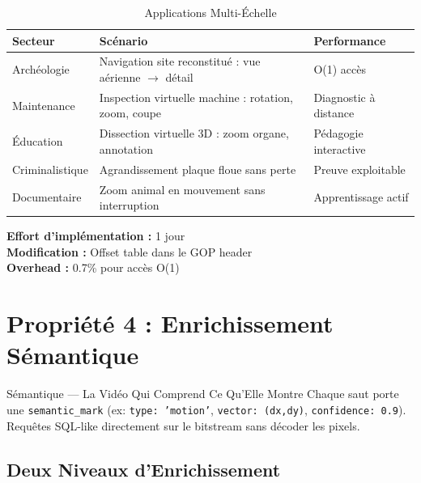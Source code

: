 \documentclass[12pt,a4paper]{article}
\begin{document}
	\begin{table}[h]
		\centering
		\caption{Applications Multi-Échelle}
		\label{tab:multi_echelle}
		\begin{tabular}{@{}lll@{}}
			\toprule
			\textbf{Secteur} & \textbf{Scénario} & \textbf{Performance} \\ \midrule
			Archéologie & Navigation site reconstitué : vue aérienne $\to$ détail & O(1) accès \\
			Maintenance & Inspection virtuelle machine : rotation, zoom, coupe & Diagnostic à distance \\
			Éducation & Dissection virtuelle 3D : zoom organe, annotation & Pédagogie interactive \\
			Criminalistique & Agrandissement plaque floue sans perte & Preuve exploitable \\
			Documentaire & Zoom animal en mouvement sans interruption & Apprentissage actif \\
			\bottomrule
		\end{tabular}
	\end{table}
	
	\begin{techbox}
		\textbf{Effort d'implémentation :} 1 jour \\
		\textbf{Modification :} Offset table dans le GOP header \\
		\textbf{Overhead :} 0.7\% pour accès O(1)
	\end{techbox}
	
	\section{Propriété 4 : Enrichissement Sémantique}
	
	\begin{featurebox}{Sémantique — La Vidéo Qui Comprend Ce Qu'Elle Montre}
		Chaque saut porte une \texttt{semantic\_mark} (ex: \texttt{type: 'motion'}, \texttt{vector: (dx,dy)}, \texttt{confidence: 0.9}). Requêtes SQL-like directement sur le bitstream sans décoder les pixels.
	\end{featurebox}
	
	\subsection{Deux Niveaux d'Enrichissement}
	
\end{document}
